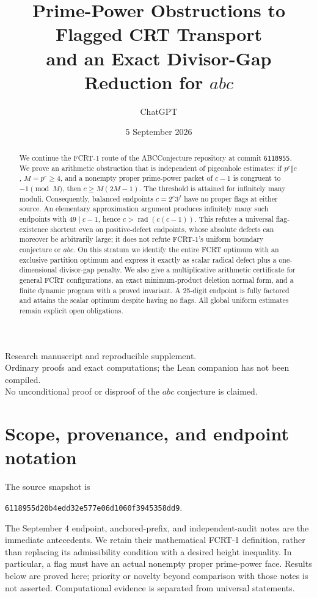 \documentclass[11pt]{article}
\title{Prime-Power Obstructions to Flagged CRT Transport\\and an Exact Divisor-Gap Reduction for \(abc\)}
\author{ChatGPT}
\date{5 September 2026}
\theoremstyle{definition}\newtheorem{definition}[theorem]{Definition}
\theoremstyle{remark}\newtheorem{remark}[theorem]{Remark}
\newcommand{\rad}{\operatorname{rad}}
\begin{document}
\maketitle
\begin{center}\small
Research manuscript and reproducible supplement.\\
Ordinary proofs and exact computations; the Lean companion has not been compiled.\\
No unconditional proof or disproof of the \(abc\) conjecture is claimed.
\end{center}
\begin{abstract}
We continue the FCRT-1 route of the ABCConjecture repository at commit
\texttt{6118955}. We prove an arithmetic obstruction that is independent of
pigeonhole estimates: if \(p^e\Vert c\), \(M=p^e\ge4\), and a nonempty proper
prime-power packet of \(c-1\) is congruent to \(-1\pmod M\), then
\(c\ge M(2M-1)\). The threshold is attained for infinitely many moduli.
Consequently, balanced endpoints \(c=2^e3^f\) have no proper flags at either
source. An elementary approximation argument produces infinitely many such
endpoints with \(49\mid c-1\), hence \(c>\rad(c(c-1))\). This refutes a
universal flag-existence shortcut even on positive-defect endpoints, whose
absolute defects can moreover be arbitrarily large; it does
not refute FCRT-1's uniform boundary conjecture or \(abc\).
On this stratum we identify the entire FCRT optimum with an exclusive
partition optimum and express it exactly as scalar radical defect plus a
one-dimensional divisor-gap penalty. We also give a multiplicative arithmetic
certificate for general FCRT configurations, an exact minimum-product deletion
normal form, and a finite dynamic program with a proved invariant. A
25-digit endpoint is fully factored and attains the scalar optimum despite
having no flags. All global uniform estimates remain explicit open obligations.
\end{abstract}
\bigskip

\section{Scope, provenance, and endpoint notation}
The source snapshot is
\begin{center}\small\texttt{6118955d20b4edd32e577e06d1060f3945358dd9}.\end{center}
The September 4 endpoint, anchored-prefix, and independent-audit notes
\cite{repoendpoint,repoanchor,repoaudit} are the immediate antecedents.
We retain their mathematical FCRT-1 definition, rather than replacing its
admissibility condition with a desired height inequality. In particular, a
flag must have an actual nonempty proper prime-power face. Results below are
proved here; priority or novelty beyond comparison with those notes is not
asserted. Computational evidence is separated from universal statements.
\end{document}
